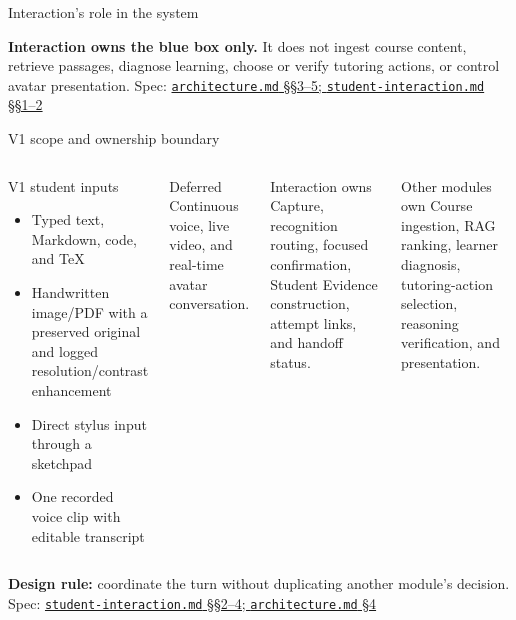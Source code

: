 \documentclass[aspectratio=169,10pt]{beamer}
\newcommand{\specnote}[2]{%
  \vfill\hfill{\tiny\color{Muted}Spec: \href{run:../../specs/#1}{\texttt{#1} #2}}}
\begin{document}
\begin{frame}{Interaction's role in the system}
\vspace{.35em}

\textbf{Interaction owns the blue box only.} It does not ingest course content, retrieve passages, diagnose learning, choose or verify tutoring actions, or control avatar presentation.
\specnote{architecture.md}{\S\S3--5; \texttt{student-interaction.md} \S\S1--2}
\end{frame}

\begin{frame}{V1 scope and ownership boundary}
\small
\begin{columns}[T,onlytextwidth]
\begin{block}{V1 student inputs}
\begin{itemize}
\item Typed text, Markdown, code, and TeX
\item Handwritten image/PDF with a preserved original and logged resolution/contrast enhancement
\item Direct stylus input through a sketchpad
\item One recorded voice clip with editable transcript
\end{itemize}
\end{block}
\begin{block}{Deferred}
Continuous voice, live video, and real-time avatar conversation.
\end{block}
\begin{block}{Interaction owns}
Capture, recognition routing, focused confirmation, Student Evidence construction, attempt links, and handoff status.
\end{block}
\begin{block}{Other modules own}
Course ingestion, RAG ranking, learner diagnosis, tutoring-action selection, reasoning verification, and presentation.
\end{block}
\end{columns}
\vspace{.35em}
\centering
\textbf{Design rule:} coordinate the turn without duplicating another module's decision.
\specnote{student-interaction.md}{\S\S2--4; \texttt{architecture.md} \S4}
\end{frame}
\end{document}
